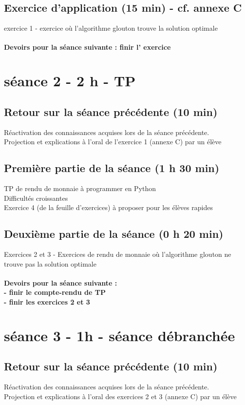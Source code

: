 \documentclass[12pt,french]{report}
\begin{document}
\subsection{Exercice d'application (15 min) - cf. annexe C}
exercice 1  - exercice où l'algorithme glouton trouve la solution optimale
\paragraph{Devoirs pour la séance suivante : finir l' exercice }
\section{séance 2 - 2 h - TP}
\subsection{Retour sur la séance précédente (10 min)}
Réactivation des connaissances acquises lors de la séance précédente.\\
Projection et explications à l’oral de l’exercice 1 (annexe C) par un élève
\subsection{Première partie de la séance (1 h 30 min)}
TP de rendu de monnaie à programmer en Python\\
Difficultés croissantes\\
Exercice 4 (de la feuille d'exercices) à proposer pour les élèves rapides
\subsection{Deuxième partie de la séance (0 h 20 min)}
Exercices 2 et 3 - Exercices de rendu de monnaie où l'algorithme glouton ne trouve pas la solution optimale
\paragraph{Devoirs pour la séance suivante :\\
- finir le compte-rendu de TP\\
- finir les exercices 2 et 3}
\section{séance 3 - 1h - séance débranchée}
\subsection{Retour sur la séance précédente (10 min)}
Réactivation des connaissances acquises lors de la séance précédente.\\
Projection et explications à l’oral des exercices 2 et 3 (annexe C) par un élève
\end{document}
